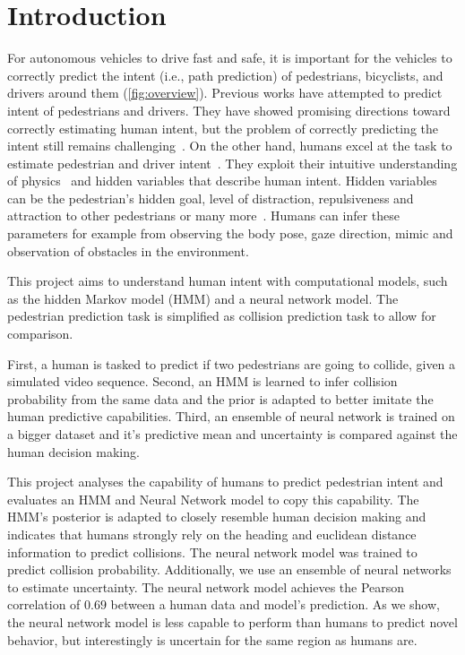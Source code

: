 
\section{Introduction} \label{sec:intro}
For autonomous vehicles to drive fast and safe, it is important for the vehicles to correctly predict the intent (i.e., path prediction) of pedestrians, bicyclists, and drivers around them (\cref{fig:overview}). 
Previous works have attempted to predict intent of pedestrians and drivers. They have showed promising directions toward correctly estimating human intent, but the problem of correctly predicting the intent still remains challenging~\cite{Alahi2016, Morris2011}. 
On the other hand, humans excel at the task to estimate pedestrian and driver intent~\cite{Keller2014}. 
They exploit their intuitive understanding of physics~\cite{Battaglia2013} and hidden variables that describe human intent. Hidden variables can be the pedestrian's hidden goal, level of distraction, repulsiveness and attraction to other pedestrians or many more~\cite{Helbing1998}. Humans can infer these parameters for example from observing the body pose, gaze direction, mimic and observation of obstacles in the environment.

This project aims to understand human intent with computational models, such as the hidden Markov model (HMM) and a neural network model. The pedestrian prediction task is simplified as collision prediction task to allow for comparison.

First, a human is tasked to predict if two pedestrians are going to collide, given a simulated video sequence. Second, an HMM is learned to infer collision probability from the same data and the prior is adapted to better imitate the human predictive capabilities. Third, an ensemble of neural network is trained on a bigger dataset and it's predictive mean and uncertainty is compared against the human decision making. 

This project analyses the capability of humans to predict pedestrian intent and evaluates an HMM and Neural Network model to copy this capability. The HMM's posterior is adapted to closely resemble human decision making and indicates that humans strongly rely on the heading and euclidean distance information to predict collisions. The neural network model was trained to predict collision probability. Additionally, we use an ensemble of neural networks to estimate uncertainty. The neural network model achieves the Pearson correlation of $0.69$ between a human data and model's prediction. As we show, the neural network model is less capable to perform than humans to predict novel behavior, but interestingly is uncertain for the same region as humans are.

